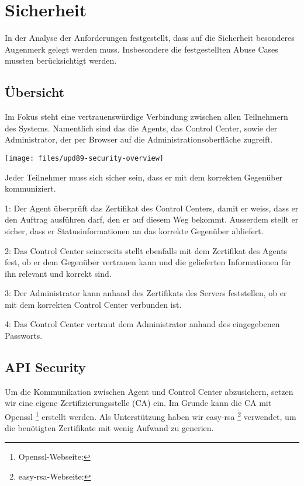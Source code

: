 \section{Sicherheit}

In der Analyse der Anforderungen festgestellt, dass auf die Sicherheit besonderes Augenmerk gelegt werden muss. Insbesondere die festgestellten Abuse Cases mussten berücksichtigt werden.

\subsection{Übersicht}

Im Fokus steht eine vertrauenswürdige Verbindung zwischen allen Teilnehmern des Systems. Namentlich sind das die Agents, das Control Center, sowie der Administrator, der per Browser auf die Administrationsoberfläche zugreift.

\begin{center}
    \texttt{[image: files/upd89-security-overview]}
\end{center}

\xxx[caption!]

Jeder Teilnehmer muss sich sicher sein, dass er mit dem korrekten Gegenüber kommuniziert.

1: Der Agent überprüft das Zertifikat des Control Centers, damit er weiss, dass er den Auftrag ausführen darf, den er auf diesem Weg bekommt. Ausserdem stellt er sicher, dass er Statusinformationen an das korrekte Gegenüber abliefert.

2: Das Control Center seinerseits stellt ebenfalls mit dem Zertifikat des Agents fest, ob er dem Gegenüber vertrauen kann und die gelieferten Informationen für ihn relevant und korrekt sind.

3: Der Administrator kann anhand des Zertifikats des Servers feststellen, ob er mit dem korrekten Control Center verbunden ist.

4: Das Control Center vertraut dem Administrator anhand des eingegebenen Passworts.

\subsection{API Security}

Um die Kommunikation zwischen Agent und Control Center abzusichern, setzen wir eine eigene Zertifizierungsstelle (CA) ein. Im Grunde kann die CA mit Openssl \footnote{Openssl-Webseite: } erstellt werden. Als Unterstützung haben wir easy-rsa \footnote{easy-rsa-Webseite: } verwendet, um die benötigten Zertifikate mit wenig Aufwand zu generien.



